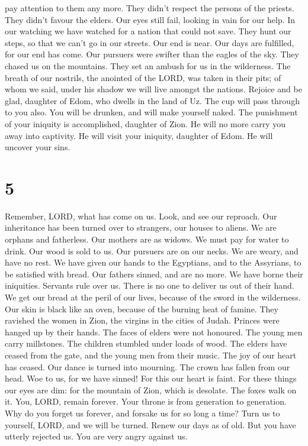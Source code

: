 pay attention to them any more. They didn't respect the persons of the
priests. They didn't favour the elders.  Our eyes still
fail, looking in vain for our help. In our watching we have watched for
a nation that could not save.  They hunt our steps, so that
we can't go in our streets. Our end is near. Our days are fulfilled, for
our end has come.  Our pursuers were swifter than the
eagles of the sky. They chased us on the mountains. They set an ambush
for us in the wilderness.  The breath of our nostrils, the
anointed of the LORD, was taken in their pits; of whom we said, under
his shadow we will live amongst the nations.  Rejoice and
be glad, daughter of Edom, who dwells in the land of Uz. The cup will
pass through to you also. You will be drunken, and will make yourself
naked.  The punishment of your iniquity is accomplished,
daughter of Zion. He will no more carry you away into captivity. He will
visit your iniquity, daughter of Edom. He will uncover your sins.

\hypertarget{section-4}{%
\section{5}\label{section-4}}

 Remember, LORD, what has come on us. Look, and see our
reproach.  Our inheritance has been turned over to
strangers, our houses to aliens.  We are orphans and
fatherless. Our mothers are as widows.  We must pay for
water to drink. Our wood is sold to us.  Our pursuers are on
our necks. We are weary, and have no rest.  We have given
our hands to the Egyptians, and to the Assyrians, to be satisfied with
bread.  Our fathers sinned, and are no more. We have borne
their iniquities.  Servants rule over us. There is no one to
deliver us out of their hand.  We get our bread at the peril
of our lives, because of the sword in the wilderness.  Our
skin is black like an oven, because of the burning heat of famine.
 They ravished the women in Zion, the virgins in the cities
of Judah.  Princes were hanged up by their hands. The faces
of elders were not honoured.  The young men carry
millstones. The children stumbled under loads of wood.  The
elders have ceased from the gate, and the young men from their music.
 The joy of our heart has ceased. Our dance is turned into
mourning.  The crown has fallen from our head. Woe to us,
for we have sinned!  For this our heart is faint. For these
things our eyes are dim:  for the mountain of Zion, which
is desolate. The foxes walk on it.  You, LORD, remain
forever. Your throne is from generation to generation.  Why
do you forget us forever, and forsake us for so long a time?
 Turn us to yourself, LORD, and we will be turned. Renew
our days as of old.  But you have utterly rejected us. You
are very angry against us.
